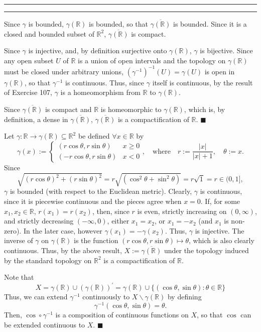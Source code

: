 \documentclass[11pt]{article}
\newcounter{questionCounter}
\newcounter{partCounter}[questionCounter]
\newenvironment{question}[2][\arabic{questionCounter}]{%
    \setcounter{partCounter}{0}%
    \vspace{.25in} \hrule \vspace{0.5em}%
        \noindent{\bf #2}%
    \vspace{0.8em} \hrule \vspace{.10in}%
    \addtocounter{questionCounter}{1}%
}{}
\renewcommand{\qed}{\quad $\blacksquare$}
\newcommand{\inv}{^{-1}}
\newcommand{\sminus}{\backslash}
\newcommand{\R}{\mathbb{R}} %
\begin{document}
\begin{question}{Problem 5}
Since $\gamma$ is bounded, $\gamma(\R)$ is bounded, so that
$\overline{\gamma(\R)}$ is bounded. Since it is a closed and bounded subset of
$\R^2$, $\overline{\gamma(\R)}$ is compact.

Since $\gamma$ is injective, and,
by definition surjective onto $\gamma(\R)$, $\gamma$ is bijective.
Since any open subset $U$ of $\R$ is a union of open intervals and the
topology on $\gamma(\R)$ must be closed under arbitrary unions,
$(\gamma\inv)\inv(U) = \gamma(U)$ is open in $\gamma(\R)$, so that
$\gamma\inv$ is continuous. Thus, since $\gamma$ itself is continuous, by the
result of Exercise 107, $\gamma$ is a homeomorphism from $\R$ to $\gamma(\R)$.

Since $\overline{\gamma(\R)}$ is compact and $\R$ is homeomorphic to
$\gamma(\R)$, which is, by definition, a dense in $\overline{\gamma(\R)}$,
$\overline{\gamma(\R)}$ is a compactification of $\R$. \qed

Let $\gamma: \R \rightarrow \gamma(\R) \subseteq \R^2$ be defined
$\forall x \in \R$ by
\[\gamma(x) :=
    \left\{
        \begin{array}{cl}
            \left(
                r\cos\theta,
                r\sin\theta
            \right) & x \geq 0 \\
            \left(
                -r\cos\theta,
                r\sin\theta
            \right) & x <    0
        \end{array}
    \right.,
    \quad \mbox{where} \quad
r := \frac{|x|}{|x| + 1},
    \quad
\theta := x.
\]
Since 
\[\sqrt{(r\cos\theta)^2 + (r\sin\theta)^2}
    = r\sqrt{(\cos^2\theta + \sin^2\theta)}
    = r\sqrt1
    = r \in (0,1],
\]
$\gamma$ is bounded (with respect to the Euclidean metric). Clearly, $\gamma$
is continuous, since it is piecewise continuous and the pieces agree when
$x = 0$. If, for some $x_1,x_2 \in \R$, $r(x_1) = r(x_2)$, then, since $r$ is
even, strictly increasing on $(0,\infty)$, and strictly decreasing
$(-\infty,0)$, either $x_1 = x_2$, or $x_1 = -x_2$ (and $x_1$ is non-zero). In
the later case, however $\gamma(x_1) = -\gamma(x_2)$. Thus, $\gamma$ is
injective. The inverse of $\gamma$ on $\gamma(\R)$ is the function
$(r\cos\theta,r\sin\theta) \mapsto \theta$, which is also clearly continuous.
Thus, by the above result, $X := \overline{\gamma(\R)}$ under the topology
induced by the standard topology on $\R^2$ is a compactification of $\R$.

Note that
\[X
 = \gamma(\R) \cup (\gamma(\R))^{\prime}
 = \gamma(\R) \cup \{(\cos\theta,\sin\theta) : \theta \in \R\}
\]
Thus, we can extend $\gamma\inv$ continuously to $X \sminus \gamma(\R)$ by
defining
\[\gamma\inv(\cos\theta,\sin\theta) = \theta.\]
Then, $\cos \circ \gamma\inv$ is a composition of continuous functions on $X$,
so that $\cos$ can be extended continuous to $X$. \qed
\end{question}
\end{document}
